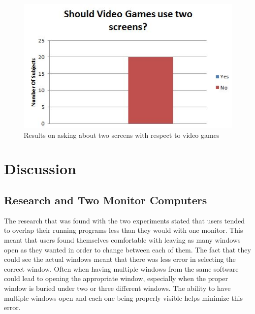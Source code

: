 \documentclass[11pt]{article}
\begin{document}
\begin{figure}[h!]
  \centering
    \includegraphics[width= 1\textwidth]{./Images/VideoGames}
  \caption{Results on asking about two screens with respect to video games}
 \label{Videogames}
\end{figure}

\section{Discussion}
\subsection{Research and Two Monitor Computers}
The research that was found with the two experiments stated that users tended to overlap their running programs less than they would with one monitor. This meant that users found themselves comfortable with leaving as many windows open as they wanted in order to change between each of them. The fact that they could see the actual windows meant that there was less error in selecting the correct window. Often when having multiple windows from the same software could lead to opening the appropriate window, especially when the proper window is buried under two or three different windows. The ability to have multiple windows open and each one being properly visible helps minimize this error. 
\end{document}

